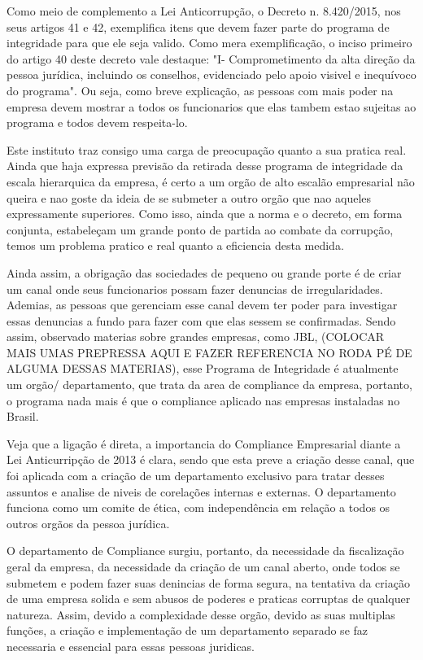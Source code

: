 Como meio de complemento a Lei Anticorrupção, o Decreto n. 8.420/2015, nos seus artigos 41 e 42, exemplifica itens que devem fazer parte do programa de integridade para que ele seja valido. Como mera exemplificação, o inciso primeiro do artigo 40 deste decreto vale destaque: "I- Comprometimento da alta direção da pessoa jurídica, incluindo os conselhos, evidenciado pelo apoio visivel e inequívoco do programa". Ou seja, como breve explicação, as pessoas com mais poder na empresa devem mostrar a todos os funcionarios que elas tambem estao sujeitas ao programa e todos devem respeita-lo. 

Este instituto traz consigo uma carga de preocupação quanto a sua pratica real. Ainda que haja expressa previsão da retirada desse programa de integridade da escala hierarquica da empresa, é certo a um orgão de alto escalão empresarial não queira e nao goste da ideia de se submeter a outro orgão que nao aqueles expressamente superiores. Como isso, ainda que a norma e o decreto, em forma conjunta, estabeleçam um grande ponto de partida ao combate da corrupção, temos um problema pratico e real quanto a eficiencia desta medida. 

Ainda assim, a obrigação das sociedades de pequeno ou grande porte é de criar um canal onde seus funcionarios possam fazer denuncias de irregularidades. Ademias, as pessoas que gerenciam esse canal devem ter poder para investigar essas denuncias a fundo para fazer com que elas sessem se confirmadas. Sendo assim, observado materias sobre grandes empresas, como JBL, (COLOCAR MAIS UMAS PREPRESSA AQUI E FAZER REFERENCIA NO RODA PÉ DE ALGUMA DESSAS MATERIAS), esse Programa de Integridade é atualmente um orgão/ departamento, que trata da area de compliance da empresa, portanto, o programa nada mais é que o compliance aplicado nas empresas instaladas no Brasil. 

Veja que a ligação é direta, a importancia do Compliance Empresarial diante a Lei Anticurripção de 2013 é clara, sendo que esta preve a criação desse canal, que foi aplicada com a criação de um departamento exclusivo para tratar desses assuntos e analise de niveis de corelações internas e externas. O departamento funciona como um comite de ética, com independência em relação a todos os outros orgãos da pessoa jurídica. 

O departamento de Compliance surgiu, portanto, da necessidade da fiscalização geral da empresa, da necessidade da criação de um canal aberto, onde todos se submetem e podem fazer suas denincias de forma segura, na tentativa da criação de uma empresa solida e sem abusos de poderes e praticas corruptas de qualquer natureza. Assim, devido a complexidade desse orgão, devido as suas multiplas funções, a criação e implementação de um departamento separado se faz necessaria e essencial para essas pessoas juridicas. 


